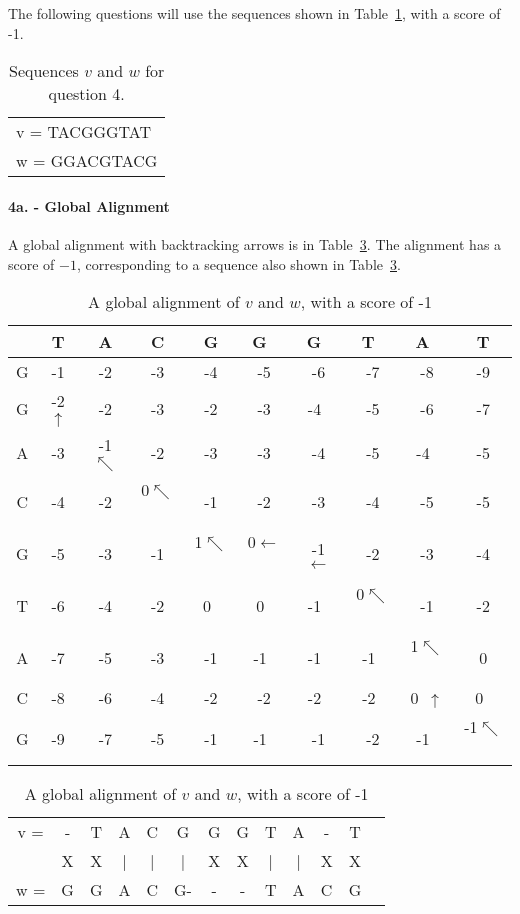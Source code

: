 \documentclass[12pt]{amsart}
\begin{document}
\clearpage

\section{} The following questions will use the sequences shown in Table~\ref{4sequences}, with a score of -1.
\begin{table}[htb]
\begin{tabular}{l}
v = TACGGGTAT\\
w = GGACGTACG
\end{tabular}
\caption{Sequences $v$ and $w$ for question 4.}
\label{4sequences}
\end{table}
\paragraph{4a. - Global Alignment}  A global alignment with backtracking arrows is in Table~\ref{galigntable}.  The alignment has a score of $-1$, corresponding to a sequence also shown in Table~\ref{galigntable}.

\begin{table}[htb]
\begin{tabular}{|c|c|c|c|c|c|c|c|c|c|}\hline
& T&A&C& G & G & G & T & A & T \\ \hline
G & -1 & -2 & -3 & -4 & -5 & -6 & -7 & -8 & -9 \\ \hline
G & -2$\uparrow$ & -2 & -3 & -2 & -3 & -4  & -5 & -6 & -7 \\ \hline
A & -3 & -1$\nwarrow$ & -2 & -3 & -3 & -4 & -5 & -4  & -5 \\ \hline
C & -4 & -2 & 0$\nwarrow$  & -1 & -2 & -3 & -4 & -5 & -5 \\ \hline
G & -5 & -3 & -1 & 1$\nwarrow$ & 0$\leftarrow$ & -1 $\leftarrow$& -2 & -3 & -4 \\ \hline
T & -6 & -4 & -2 & 0  & 0  & -1  & 0$\nwarrow$  &-1&-2\\ \hline
A & -7 & -5 & -3 & -1 & -1  & -1  & -1  & 1$\nwarrow$ &0\\ \hline
C & -8 & -6 & -4 & -2 & -2 & -2  & -2  & 0 $\uparrow$ & 0  \\\hline
G & -9 & -7 & -5 & -1 & -1  & -1 & -2 & -1  & -1$\nwarrow$  \\\hline
\end{tabular}
\begin{tabular}{ccccccccccccc}
v = &-&T&A&C&G&G&G&T&A&-&T\\
&X&X&|&|&|&X&X&|&|&X&X\\
w = &G&G&A&C&G-&-&-&T&A&C&G\\
\end{tabular}
\caption{A global alignment of $v$ and $w$, with a score of -1}
\label{galigntable}
\end{table}
\end{document}
